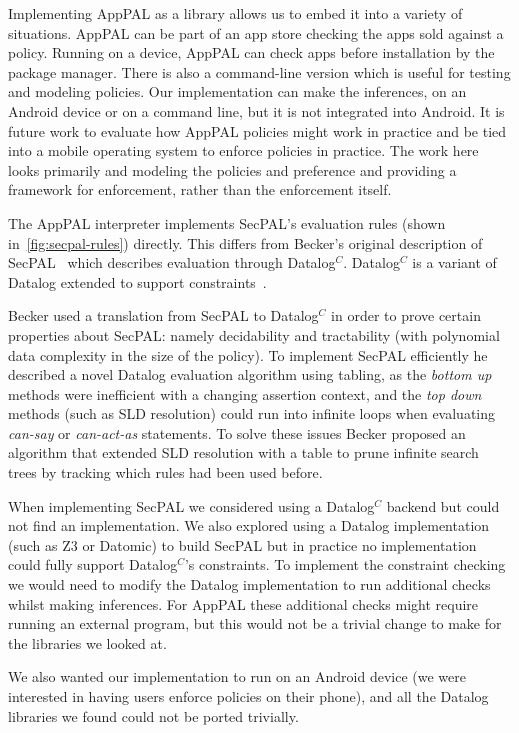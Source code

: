 \documentclass[thesis.tex]{subfiles}
\begin{document}
Implementing AppPAL as a library allows us to embed it into a variety of
situations. AppPAL can be part of an app store checking the apps sold against a
policy. Running on a device, AppPAL can check apps before installation by the
package manager. There is also a command-line version which is useful for
testing and modeling policies. Our implementation can make the inferences, on
an Android device or on a command line, but it is not integrated into Android. It
is future work to evaluate how AppPAL policies might work in practice and be
tied into a mobile operating system to enforce policies in practice. The work
here looks primarily and modeling the policies and preference and providing a
framework for enforcement, rather than the enforcement itself.

The AppPAL interpreter implements SecPAL's evaluation rules (shown
in~\autoref{fig:secpal-rules}) directly. This differs from Becker's original
description of SecPAL~\cite{becker_secpal:_2006} which describes evaluation
through Datalog$^C$. Datalog$^C$ is a variant of Datalog extended to support
constraints~\cite{li_datalog_2003}. 

Becker used a translation from SecPAL to Datalog$^C$ in order to prove
certain properties about SecPAL: namely decidability and tractability
(with polynomial data complexity in the size of the policy). To
implement SecPAL efficiently he described a novel Datalog evaluation
algorithm using tabling, as the \emph{bottom up} methods were
inefficient with a changing assertion context, and the \emph{top down}
methods (such as SLD resolution) could run into infinite loops when
evaluating \emph{can-say} or \emph{can-act-as} statements. To solve
these issues Becker proposed an algorithm that extended SLD resolution
with a table to prune infinite search trees by tracking which rules
had been used before.

When implementing SecPAL we considered using a Datalog$^C$ backend but could
not find an implementation. We also explored using a Datalog implementation
(such as Z3 or Datomic) to build SecPAL but in practice no implementation could
fully support Datalog$^C$'s constraints.  To implement the constraint checking
we would need to modify the Datalog implementation to run additional checks
whilst making inferences.  For AppPAL these additional checks might require
running an external program, but this would not be a trivial change to make for
the libraries we looked at.

We also wanted our implementation to run on an Android
device (we were interested in having users enforce policies on their phone),
and all the Datalog libraries we found could not be ported trivially.
\end{document}
